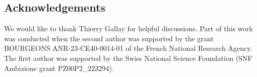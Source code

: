 \documentclass[11pt,reqno,a4paper]{amsart}
\newcommand{\1}{\mathbbm{1}}
\theoremstyle{definition}
\theoremstyle{definition}
\numberwithin{equation}{section}
\begin{document}







\subsection*{Acknowledgements}
\text{~}
We would like to thank Thierry Gallay for helpful discussions.
Part of this work was conducted when the second author was supported by the grant BOURGEONS ANR-23-CE40-0014-01 of the French National Research Agency.
The first author was supported by the Swiss National Science Foundation (SNF Ambizione grant PZ00P2\_223294).





\end{document}
